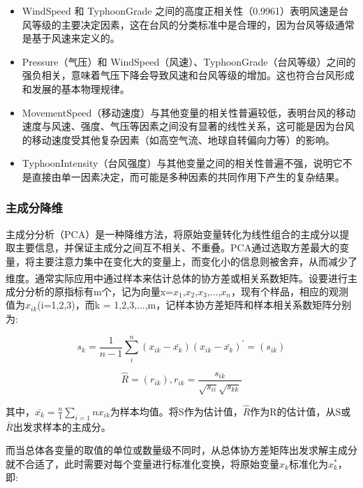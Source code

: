 \documentclass[withoutpreface,bwprint]{cumcmthesis}
\begin{document}
\begin{itemize}
    \setlength{\itemindent}{2em}
    \item WindSpeed 和 TyphoonGrade 之间的高度正相关性（0.9961）表明风速是台风等级的主要决定因素，这在台风的分类标准中是合理的，因为台风等级通常是基于风速来定义的。

    \item Pressure（气压）和 WindSpeed（风速）、TyphoonGrade（台风等级）之间的强负相关，意味着气压下降会导致风速和台风等级的增加。这也符合台风形成和发展的基本物理规律。

    \item MovementSpeed（移动速度）与其他变量的相关性普遍较低，表明台风的移动速度与风速、强度、气压等因素之间没有显著的线性关系，这可能是因为台风的移动速度受其他复杂因素（如高空气流、地球自转偏向力等）的影响。

    \item TyphoonIntensity（台风强度）与其他变量之间的相关性普遍不强，说明它不是直接由单一因素决定，而可能是多种因素的共同作用下产生的复杂结果。
    
\end{itemize}

\subsubsection{主成分降维}

主成分分析（PCA）是一种降维方法，将原始变量转化为线性组合的主成分以提取主要信息，并保证主成分之间互不相关、不重叠。PCA通过选取方差最大的变量，将主要注意力集中在变化大的变量上，而变化小的信息则被舍弃，从而减少了维度。通常实际应用中通过样本来估计总体的协方差或相关系数矩阵\textsuperscript{\cite{abdi2010principal}}。设要进行主成分分析的原指标有m个，记为向量x=$x_{1}$,$x_{2}$,$x_{3}$,...,$x_{n}$，现有个样品，相应的观测值为$x_{ik}$(i=1,2,3)，而k = 1,2,3,...,m，记样本协方差矩阵和样本相关系数矩阵分别为:

\[
s_{k}=\frac{1}{n-1}\sum_{i}^{n}(x_{ik}-\bar{x_{k}})(x_{ik}-\bar{x_{k}})^{'}=(s_{ik})      
\]

\[
\hat{R}=(r_{ik}), r_{ik}=\frac{s_{ik}}{\sqrt{s_{ii}}\sqrt{s_{kk}}  }  
\]

其中，$\bar{x_{k}}=\frac{n}{1}\sum_{i=1}{n}x_{ik}$为样本均值。将S作为估计值，$\hat{R}$作为R的估计值，从S或$\bar{R}$出发求样本的主成分。

而当总体各变量的取值的单位或数量级不同时，从总体协方差矩阵出发求解主成分就不合适了，此时需要对每个变量进行标准化变换，将原始变量$x_{k}$标准化为$x_{k}^{*}$，即:
\end{document}
